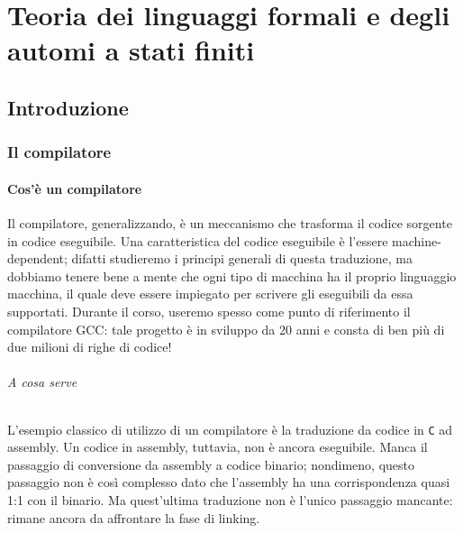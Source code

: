 \documentclass[class=book, crop=false, oneside, 12pt]{standalone}
\begin{document}
\part[Teoria dei linguaggi e degli automi]{Teoria dei linguaggi formali e degli automi a stati finiti}
\chapter{Introduzione}

\section{Il compilatore}
\subsection{Cos'è un compilatore}
Il compilatore, generalizzando, è un meccanismo che trasforma il codice sorgente in codice eseguibile.
Una caratteristica del codice eseguibile è l'essere machine-dependent; difatti studieremo i principi generali di questa traduzione, ma dobbiamo tenere bene a mente che ogni tipo di macchina ha il proprio linguaggio macchina, il quale deve essere impiegato per scrivere gli eseguibili da essa supportati. Durante il corso, useremo spesso come punto di riferimento il compilatore GCC: tale progetto è in sviluppo da 20 anni e consta di ben più di due milioni di righe di codice!

\paragraph{A cosa serve}
L’esempio classico di utilizzo di un compilatore è la traduzione da codice in \texttt{C} ad assembly.
Un codice in assembly, tuttavia, non è ancora eseguibile. Manca il passaggio di conversione da assembly a codice binario; nondimeno, questo passaggio non è così complesso dato che l'assembly ha una corrispondenza quasi 1:1 con il binario.
Ma quest’ultima traduzione non è l’unico passaggio mancante: rimane ancora da affrontare la fase di linking.
\end{document}

